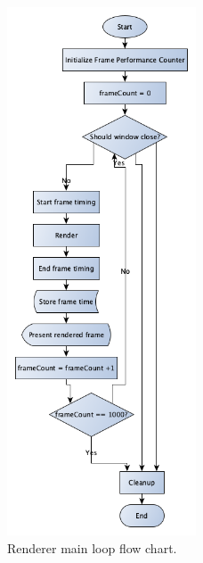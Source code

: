\begin{figure}[hbt!]
  \centering
  \includegraphics[width=0.5\textwidth]{figuras/main-loop-flowchart.png}
  \caption{Renderer main loop flow chart.}
  \label{main-loop-flowchart}
\end{figure}

